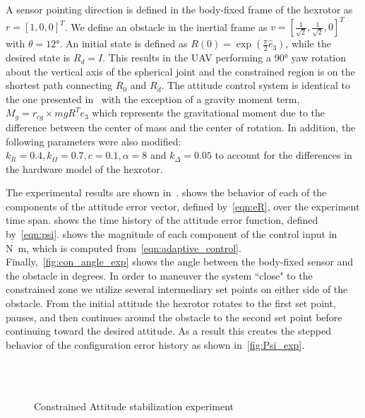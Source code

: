 \documentclass[10pt,fleqn]{IJCAS}  %
\begin{document}
\begin{multicols}{2}
A sensor pointing direction is defined in the body-fixed frame of the hexrotor as \( r = [1,0,0]^T \).
We define an obstacle in the inertial frame as \( v = [\frac{1}{\sqrt{2}}, \frac{1}{\sqrt{2}}, 0]^T \) with \( \theta = \ang{12} \).
An initial state is defined as \(R(0) = \exp( \frac{\pi}{2} \hat{e}_3) \), while the desired state is \(R_d =I \).
This results in the UAV performing a \ang{90} yaw rotation about the vertical axis of the spherical joint and the constrained region is on the shortest path connecting $R_0$ and $R_d$. 
The attitude control system is identical to the one presented in~ with the exception of a gravity moment term, \( M_g = r_{cg} \times m g R^T e_3\) which represents the gravitational moment due to the difference between the center of mass and the center of rotation. 
In addition, the following parameters were also modified: \(k_R = 0.4, k_\Omega = 0.7 ,c = 0.1 , \alpha = 8 \text{ and } k_\Delta = 0.05\) to account for the differences in the hardware model of the hexrotor.

The experimental results are shown in~.
 shows the behavior of each of the components of the attitude error vector, defined by~\cref{eqn:eR}, over the experiment time span.
 shows the time history of the attitude error function, defined by~\cref{eqn:psi}.
 shows the magnitude of each component of the control input in \si{\newton\meter}, which is computed from~\cref{eqn:adaptive_control}.
Finally,~\cref{fig:con_angle_exp} shows the angle between the body-fixed sensor and the obstacle in degrees.
In order to maneuver the system ``close" to the constrained zone we utilize several intermediary set points on either side of the obstacle.
From the initial attitude the hexrotor rotates to the first set point, pauses, and then continues around the obstacle to the second set point before continuing toward the desired attitude.
As a result this creates the stepped behavior of the configuration error history as shown in~\cref{fig:Psi_exp}.

\end{multicols}
\begin{figure}[H]
    \centering 
    ~
    ~
    \\
    ~
    \caption{Constrained Attitude stabilization experiment}
    \label{fig:exp} 
\end{figure}
\end{document}
